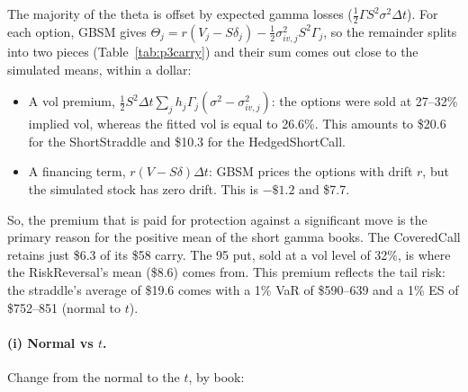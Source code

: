 \documentclass[11pt]{article}
\newcommand{\tbl}[1]{}
\begin{document}
The majority of the theta is offset by expected gamma losses ($\tfrac12\Gamma S^2\sigma^2\Delta t$). For each option, GBSM gives $\Theta_j=r(V_j-S\delta_j)-\tfrac12\sigma_{iv,j}^2S^2\Gamma_j$, so the remainder splits into two pieces (Table~\ref{tab:p3carry}) and their sum comes out close to the simulated means, within a dollar:
\begin{itemize}\setlength\itemsep{0.1em}
\item A vol premium, $\tfrac12S^2\Delta t\sum_j h_j\Gamma_j(\sigma^2-\sigma_{iv,j}^2)$: the options were sold at 27--32\% implied vol, whereas the fitted vol is equal to 26.6\%. This amounts to \$20.6 for the ShortStraddle and \$10.3 for the HedgedShortCall.
\item A financing term, $r(V-S\delta)\Delta t$: GBSM prices the options with drift $r$, but the simulated stock has zero drift. This is $-\$1.2$ and \$7.7.
\end{itemize}
So, the premium that is paid for protection against a significant move is the primary reason for the positive mean of the short gamma books. The CoveredCall retains just \$6.3 of its \$58 carry. The 95 put, sold at a vol level of 32\%, is where the RiskReversal's mean (\$8.6) comes from. This premium reflects the tail risk: the straddle's average of \$19.6 comes with a 1\% VaR of \$590--639 and a 1\% ES of \$752--851 (normal to $t$).

\paragraph{(i) Normal vs $t$.} Change from the normal to the $t$, by book:

\begin{table}[H]
\centering\small
\caption{Normal to $t$: change in mean (\$) and in each risk number (\%).}
\tbl{p3_t_vs_normal}
\end{table}
\end{document}
